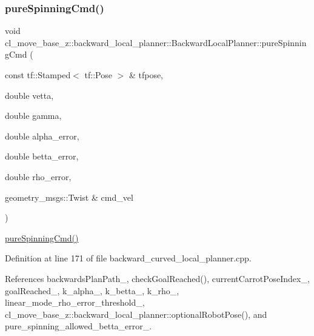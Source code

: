 \mbox{\label{classcl__move__base__z_1_1backward__local__planner_1_1BackwardLocalPlanner_aaa88a0a47e7cfd449c59518577599928}} 
\subsubsection{\texorpdfstring{pure\+Spinning\+Cmd()}{pureSpinningCmd()}}
{\footnotesize\ttfamily void cl\+\_\+move\+\_\+base\+\_\+z\+::backward\+\_\+local\+\_\+planner\+::\+Backward\+Local\+Planner\+::pure\+Spinning\+Cmd (\begin{DoxyParamCaption}\item[{const tf\+::\+Stamped$<$ tf\+::\+Pose $>$ \&}]{tfpose,  }\item[{double}]{vetta,  }\item[{double}]{gamma,  }\item[{double}]{alpha\+\_\+error,  }\item[{double}]{betta\+\_\+error,  }\item[{double}]{rho\+\_\+error,  }\item[{geometry\+\_\+msgs\+::\+Twist \&}]{cmd\+\_\+vel }\end{DoxyParamCaption})\hspace{0.3cm}{\ttfamily [private]}}

\hyperlink{classcl__move__base__z_1_1backward__local__planner_1_1BackwardLocalPlanner_aaa88a0a47e7cfd449c59518577599928}{pure\+Spinning\+Cmd()} 

Definition at line 171 of file backward\+\_\+curved\+\_\+local\+\_\+planner.\+cpp.



References backwards\+Plan\+Path\+\_\+, check\+Goal\+Reached(), current\+Carrot\+Pose\+Index\+\_\+, goal\+Reached\+\_\+, k\+\_\+alpha\+\_\+, k\+\_\+betta\+\_\+, k\+\_\+rho\+\_\+, linear\+\_\+mode\+\_\+rho\+\_\+error\+\_\+threshold\+\_\+, cl\+\_\+move\+\_\+base\+\_\+z\+::backward\+\_\+local\+\_\+planner\+::optional\+Robot\+Pose(), and pure\+\_\+spinning\+\_\+allowed\+\_\+betta\+\_\+error\+\_\+.



